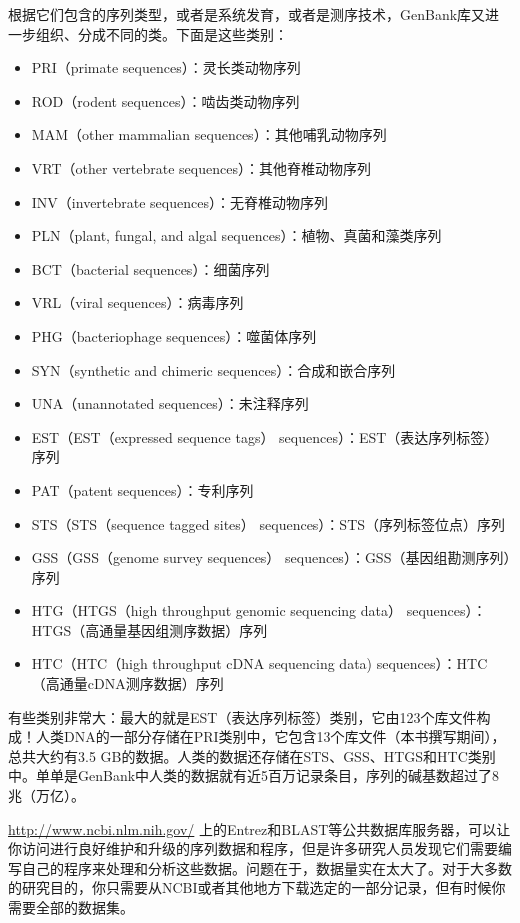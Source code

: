 根据它们包含的序列类型，或者是系统发育，或者是测序技术，GenBank库又进一步组织、分成不同的类。下面是这些类别：

\begin{itemize}
  \item PRI（primate sequences）：灵长类动物序列
  \item ROD（rodent sequences）：啮齿类动物序列
  \item MAM（other mammalian sequences）：其他哺乳动物序列
  \item VRT（other vertebrate sequences）：其他脊椎动物序列
  \item INV（invertebrate sequences）：无脊椎动物序列
  \item PLN（plant, fungal, and algal sequences）：植物、真菌和藻类序列
  \item BCT（bacterial sequences）：细菌序列
  \item VRL（viral sequences）：病毒序列
  \item PHG（bacteriophage sequences）：噬菌体序列
  \item SYN（synthetic and chimeric sequences）：合成和嵌合序列
  \item UNA（unannotated sequences）：未注释序列
  \item EST（EST（expressed sequence tags） sequences）：EST（表达序列标签）序列
  \item PAT（patent sequences）：专利序列
  \item STS（STS（sequence tagged sites） sequences）：STS（序列标签位点）序列
  \item GSS（GSS（genome survey sequences） sequences）：GSS（基因组勘测序列）序列
  \item HTG（HTGS（high throughput genomic sequencing data） sequences）：HTGS（高通量基因组测序数据）序列
  \item HTC（HTC（high throughput cDNA sequencing data) sequences）：HTC（高通量cDNA测序数据）序列
\end{itemize}

有些类别非常大：最大的就是EST（表达序列标签）类别，它由123个库文件构成！人类DNA的一部分存储在PRI类别中，它包含13个库文件（本书撰写期间），总共大约有3.5 GB的数据。人类的数据还存储在STS、GSS、HTGS和HTC类别中。单单是GenBank中人类的数据就有近5百万记录条目，序列的碱基数超过了8兆（万亿）。

\href{http://www.ncbi.nlm.nih.gov/}{http://www.ncbi.nlm.nih.gov/} 上的Entrez和BLAST等公共数据库服务器，可以让你访问进行良好维护和升级的序列数据和程序，但是许多研究人员发现它们需要编写自己的程序来处理和分析这些数据。问题在于，数据量实在太大了。对于大多数的研究目的，你只需要从NCBI或者其他地方下载选定的一部分记录，但有时候你需要全部的数据集。

